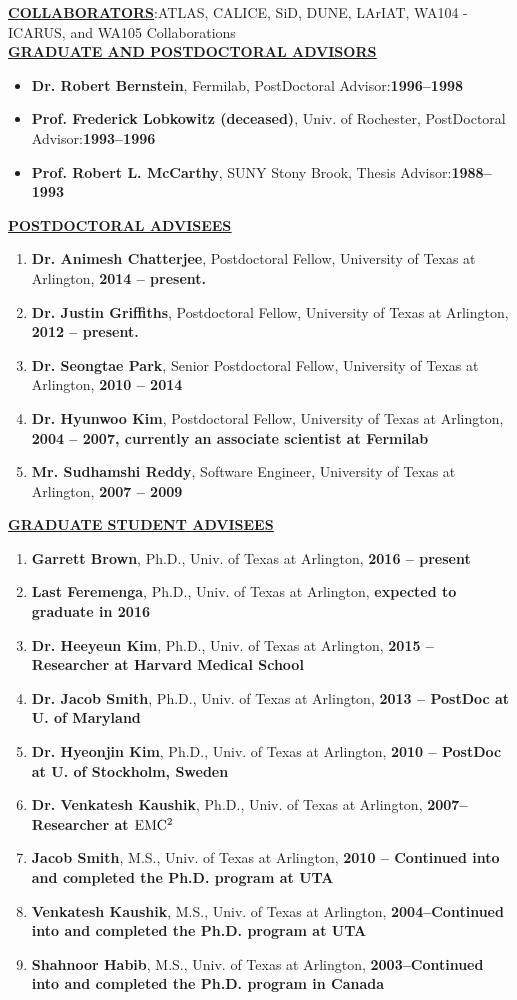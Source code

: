 %
{\underline{\underline{{\bf COLLABORATORS}}}}{:ATLAS, CALICE, SiD, DUNE, LArIAT, WA104 - ICARUS, and WA105 Collaborations}\\
%
{\underline{\underline{{\bf GRADUATE AND POSTDOCTORAL ADVISORS}}}}
\begin{itemize}[noitemsep]
\item {\bf Dr. Robert Bernstein}, Fermilab, PostDoctoral Advisor:{\bf 1996--1998}
\item {\bf Prof. Frederick Lobkowitz (deceased)}, Univ. of Rochester, PostDoctoral Advisor:{\bf 1993--1996}
\item {\bf Prof. Robert L. McCarthy}, SUNY Stony Brook, Thesis Advisor:{\bf 1988--1993}
\end{itemize}
%
{\underline{\underline{{\bf POSTDOCTORAL ADVISEES}}}}
\begin{enumerate}[noitemsep]
\item {\bf Dr. Animesh Chatterjee}, Postdoctoral Fellow, University of Texas at Arlington, {\bf 2014 -- present.}
\item {\bf Dr. Justin Griffiths}, Postdoctoral Fellow, University of Texas at Arlington, {\bf 2012 -- present.}
\item {\bf Dr. Seongtae Park}, Senior Postdoctoral Fellow, University of Texas at Arlington, 
{\bf 2010 -- 2014}
\item {\bf Dr. Hyunwoo Kim}, Postdoctoral Fellow, University of Texas at Arlington, {\bf 2004 -- 2007, 
currently an associate scientist at Fermilab}
\item {\bf Mr. Sudhamshi Reddy}, Software Engineer, University of Texas at Arlington, 
{\bf 2007 -- 2009}
\end{enumerate}
%
{\underline{\underline{{\bf GRADUATE STUDENT ADVISEES}}}}
\begin{enumerate}[noitemsep]
\item {\bf Garrett Brown}, Ph.D., Univ. of Texas at Arlington, {\bf 2016 -- present}
\item {\bf Last Feremenga}, Ph.D., Univ. of Texas at Arlington, {\bf expected to graduate in 2016}
\item {\bf Dr. Heeyeun Kim}, Ph.D., Univ. of Texas at Arlington, {\bf 2015 -- Researcher at Harvard Medical School}
\item {\bf Dr. Jacob Smith}, Ph.D., Univ. of Texas at Arlington, {\bf 2013 -- PostDoc at U. of Maryland}
\item {\bf Dr. Hyeonjin Kim}, Ph.D., Univ. of Texas at Arlington, {\bf 2010 -- PostDoc at U. of 
Stockholm, Sweden}
\item {\bf Dr. Venkatesh Kaushik}, Ph.D., Univ. of Texas at Arlington, {\bf 2007-- Researcher at ${\rm EMC^{2}}$}
\item {\bf Jacob Smith}, M.S., Univ. of Texas at Arlington, {\bf 2010 -- Continued into 
and completed the Ph.D. program at UTA}
\item {\bf Venkatesh Kaushik}, M.S., Univ. of Texas at Arlington, {\bf 2004--Continued 
into and completed the Ph.D. program at UTA}
\item {\bf Shahnoor Habib}, M.S., Univ. of Texas at Arlington, {\bf 2003--Continued into 
and completed the Ph.D. program in Canada}
\end{enumerate}
